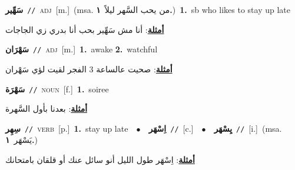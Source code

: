 \documentclass[10pt,a4paper,twoside]{article} %
\begin{document}
\begin{multicols}{2}
{\setlength\topsep{0pt}\textbf{\foreignlanguage{arabic}{سَهِّير}}\ {\color{gray}\texttt{//}\color{black}}\ \textsc{adj}\ [m.]\ \color{gray}(msa. \foreignlanguage{arabic}{من يحب السَّهر ليلاً}~\foreignlanguage{arabic}{\textbf{١.}})\color{black}\ \textbf{1.}~sb who likes to stay up late\  \begin{flushright}\color{gray}\foreignlanguage{arabic}{\textbf{\underline{\foreignlanguage{arabic}{أمثلة}}}: أنا مش سَهِّير بحب أنا بدري زي الجاجات}\end{flushright}\color{black}} \vspace{2mm}

{\setlength\topsep{0pt}\textbf{\foreignlanguage{arabic}{سَهْرَان}}\ {\color{gray}\texttt{//}\color{black}}\ \textsc{adj}\ [m.]\ \textbf{1.}~awake  \textbf{2.}~watchful\  \begin{flushright}\color{gray}\foreignlanguage{arabic}{\textbf{\underline{\foreignlanguage{arabic}{أمثلة}}}: صحيت عالساعة 3 الفجر لقيت لؤي سَهْران}\end{flushright}\color{black}} \vspace{2mm}

{\setlength\topsep{0pt}\textbf{\foreignlanguage{arabic}{سَهْرَة}}\ {\color{gray}\texttt{//}\color{black}}\ \textsc{noun}\ [f.]\ \textbf{1.}~soiree\  \begin{flushright}\color{gray}\foreignlanguage{arabic}{\textbf{\underline{\foreignlanguage{arabic}{أمثلة}}}: بعدنا بأول السَّهرة}\end{flushright}\color{black}} \vspace{2mm}

{\setlength\topsep{0pt}\textbf{\foreignlanguage{arabic}{سِهِر}}\ {\color{gray}\texttt{//}\color{black}}\ \textsc{verb}\ [p.]\ \textbf{1.}~stay up late\ \ $\bullet$\ \ \setlength\topsep{0pt}\textbf{\foreignlanguage{arabic}{اِسْهَر}}\ {\color{gray}\texttt{//}\color{black}}\ [c.]\ \ $\bullet$\ \ \setlength\topsep{0pt}\textbf{\foreignlanguage{arabic}{يِسْهَر}}\ {\color{gray}\texttt{//}\color{black}}\ [i.]\ \color{gray}(msa. \foreignlanguage{arabic}{يَسْهَر}~\foreignlanguage{arabic}{\textbf{١.}})\color{black}\  \begin{flushright}\color{gray}\foreignlanguage{arabic}{\textbf{\underline{\foreignlanguage{arabic}{أمثلة}}}: اِسْهَر طول الليل أنو سائل عنك أو قلقان بامتحانك}\end{flushright}\color{black}} \vspace{2mm}


\end{multicols}
\end{document}

